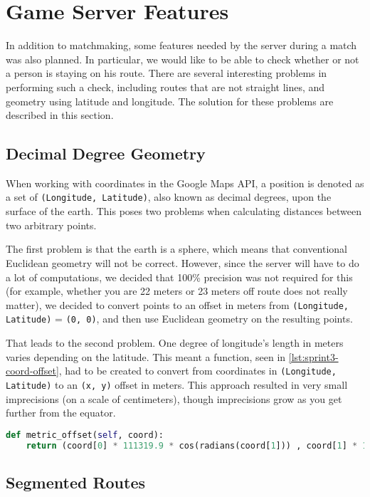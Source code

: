 \section{Game Server Features}

In addition to matchmaking, some features needed by the server during a match was also planned. In particular, we would like to be able to check whether or not a person is staying on his route. There are several interesting problems in performing such a check, including routes that are not straight lines, and geometry using latitude and longitude. The solution for these problems are described in this section.

\subsection{Decimal Degree Geometry}

When working with coordinates in the Google Maps \ac{API}, a position is denoted as a set of \texttt{(Longitude, Latitude)}, also known as decimal degrees, upon the surface of the earth. This poses two problems when calculating distances between two arbitrary points.

The first problem is that the earth is a sphere, which means that conventional Euclidean geometry will not be correct. However, since the server will have to do a lot of computations, we decided that 100\% precision was not required for this (for example, whether you are 22 meters or 23 meters off route does not really matter), we decided to convert points to an offset in meters from \texttt{(Longitude, Latitude)} = \texttt{(0, 0)}, and then use Euclidean geometry on the resulting points.

That leads to the second problem. One degree of longitude's length in meters varies depending on the latitude\cite{wikidecimaldegrees}. This meant a function, seen in \autoref{lst:sprint3-coord-offset}, had to be created to convert from coordinates in \texttt{(Longitude, Latitude)} to an \texttt{(x, y)} offset in meters. This approach resulted in very small imprecisions (on a scale of centimeters), though imprecisions grow as you get further from the equator.

\begin{lstlisting}[label={lst:sprint3-coord-offset},caption={Convert Decimal Degrees to Offset in Meters},language={Python}]
def metric_offset(self, coord):
	return (coord[0] * 111319.9 * cos(radians(coord[1])) , coord[1] * 111319.9)
\end{lstlisting}

\subsection{Segmented Routes}